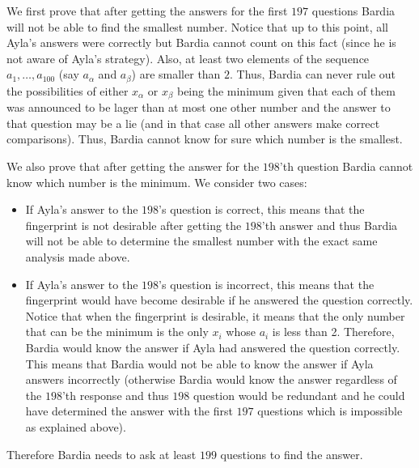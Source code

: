 \begin{solution}
We first prove that after getting the answers for the first $197$ questions Bardia will not be able to find the smallest number. Notice that up to this point, all Ayla's answers were correctly but Bardia cannot count on this fact (since he is not aware of Ayla's strategy). Also, at least two elements of the sequence $a_1, \ldots, a_{100}$ (say $a_{\alpha}$ and $a_{\beta}$) are smaller than $2$. Thus, Bardia can never rule out the possibilities of either $x_{\alpha}$ or $x_{\beta}$ being the minimum given that each of them was announced to be lager than at most one other number and the answer to that question may be a lie (and in that case all other answers make correct comparisons). Thus, Bardia cannot know for sure which number is the smallest.

We also prove that after getting the answer for the $198$'th question Bardia cannot know which number is the minimum. We consider two cases: 
\begin{itemize}
	\item If Ayla's answer to the $198$'s question is correct, this means that the fingerprint is not desirable after getting the $198$'th answer and thus Bardia will not be able to determine the smallest number with the exact same analysis made above.
	\item If Ayla's answer to the $198$'s question is incorrect, this means that the fingerprint would have become desirable if he answered the question correctly. Notice that when the fingerprint is desirable, it means that the only number that can be the minimum is the only $x_i$ whose $a_i$ is less than 2. Therefore, Bardia would know the answer if Ayla had answered the question correctly. This means that Bardia would not be able to know the answer if Ayla answers incorrectly (otherwise Bardia would know the answer regardless of the $198$'th response and thus $198$ question would be redundant and he could have determined the answer with the first $197$ questions which is impossible as explained above).
\end{itemize}

Therefore Bardia needs to ask at least $199$ questions to find the answer.
\end{solution}
